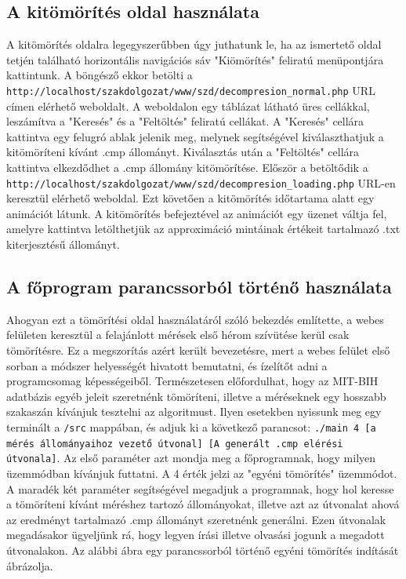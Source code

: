 \documentclass[oneside,titlepage,12pt,a4paper]{report}
\begin{document}
\subsection*{A kitömörítés oldal használata}

A kitömörítés oldalra legegyszerűbben úgy juthatunk le, ha az ismertető oldal tetjén található horizontális navigációs sáv "Kiömörítés" feliratú menüpontjára kattintunk. A böngésző ekkor betölti a \texttt{http://localhost/szakdolgozat/www/szd/decompresion\_normal.php} URL címen elérhető weboldalt. A weboldalon egy táblázat látható üres cellákkal, leszámítva a "Keresés" és a "Feltöltés" feliratú cellákat. A "Keresés" cellára kattintva egy felugró ablak jelenik meg, melynek segítségével kiválaszthatjuk a kitömöríteni kívánt .cmp állományt. Kiválasztás után a "Feltöltés" cellára kattintva elkezdődhet a .cmp állomány kitömörítése. Először a betöltődik a \texttt{http://localhost/szakdolgozat/www/szd/decompresion\_loading.php} URL-en keresztül elérhető weboldal. Ezt követően a kitömörítés időtartama alatt egy animációt látunk. A kitömörítés befejeztével az animációt egy üzenet váltja fel, amelyre kattintva letölthetjük az approximáció mintáinak értékeit tartalmazó .txt kiterjesztésű állományt.

\subsection*{A főprogram parancssorból történő használata}

Ahogyan ezt a tömörítési oldal használatáról szóló bekezdés említette, a webes felületen keresztül a felajánlott mérések első hérom szívütése kerül csak tömörítésre. Ez a megszorítás azért került bevezetésre, mert a webes felület első sorban a módszer helyességét hivatott bemutatni, és ízelítőt adni a programcsomag képességeiből. Természetesen előfordulhat, hogy az MIT-BIH adatbázis egyéb jeleit szeretnénk tömöríteni, illetve a méréseknek egy hosszabb szakaszán kívánjuk tesztelni az algoritmust. Ilyen esetekben nyissunk meg egy terminált a \texttt{/src}  mappában, és adjuk ki a következő parancsot: \texttt{./main 4 [a mérés állományaihoz vezető útvonal] [A generált .cmp elérési útvonala]}. Az első paraméter azt mondja meg a főprogramnak, hogy milyen üzemmódban kívánjuk futtatni. A 4 érték jelzi az "egyéni tömörítés" üzemmódot. A maradék két paraméter segítségével megadjuk a programnak, hogy hol keresse a tömöríteni kívánt méréshez  tartozó állományokat, illetve azt az útvonalat ahová az eredményt tartalmazó .cmp állományt szeretnénk generálni. Ezen útvonalak megadásakor ügyeljünk rá, hogy legyen írási illetve olvasási jogunk a megadott útvonalakon. Az alábbi ábra egy parancssorból történő egyéni tömörítés indítását ábrázolja.
\end{document}
